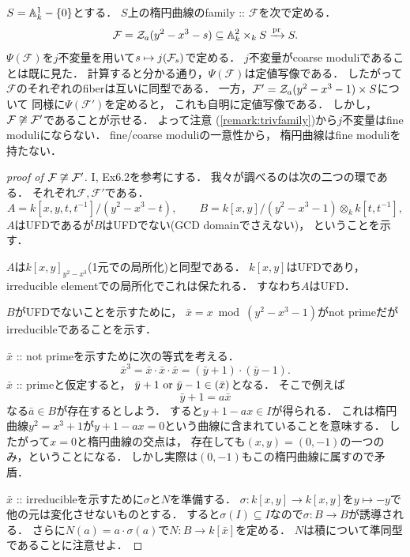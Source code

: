 \documentclass[a4paper]{jsarticle}
\newcommand{\famF}{\mathcal{F}}
\begin{document}
    $S=\mathbb{A}^1_k-\{0\}$とする．
    $S$上の楕円曲線のfamily :: $\famF$を次で定める．
    \[
        \famF=\zerosa(y^2-x^3-s) \subseteq \affine^2_k \times_k S
        \xrightarrow{\pr} S.
    \]
    $\Psi(\famF)$を$j$不変量を用いて$s \mapsto j(\mathcal{F}_s)$で定める．
    $j$不変量がcoarse moduliであることは既に見た．
    計算すると分かる通り，$\Psi(\famF)$は定値写像である．
    したがって$\famF$のそれぞれのfiberは互いに同型である．
    一方，$\famF'=\zerosa(y^2-x^3-1) \times S$について
    同様に$\Psi(\famF')$を定めると，
    これも自明に定値写像である．
    しかし，$\famF \not \iso \famF'$であることが示せる．
    よって注意 (\ref{remark:trivfamily})から$j$不変量はfine moduliにならない．
    fine/coarse moduliの一意性から，
    楕円曲線はfine moduliを持たない．
    \begin{proof}[proof of $\famF \not \iso \famF'$]
        \cite{HarAG} I, Ex6.2を参考にする．
        我々が調べるのは次の二つの環である．
        それぞれ$\famF, \famF'$である．
        \[
            A=k[x,y, t,t^{-1}]/(y^2-x^3-t),
            \qquad
            B=k[x,y]/(y^2-x^3-1) \otimes_k k[t,t^{-1}],
        \]
        $A$はUFDであるが$B$はUFDでない(GCD domainでさえない)，
        ということを示す．

        $A$は$k[x,y]_{y^2-x^3}$(1元での局所化)と同型である．
        $k[x,y]$はUFDであり，irreducible elementでの局所化でこれは保たれる．
        すなわち$A$はUFD．

        $B$がUFDでないことを示すために，
        $\bar{x}=x \bmod (y^2-x^3-1)$がnot primeだがirreducibleであることを示す．

        $\bar{x}$ :: not primeを示すために次の等式を考える．
        \[ \bar{x}^3=\bar{x} \cdot \bar{x} \cdot \bar{x}=(\bar{y}+1) \cdot (\bar{y}-1). \]
        $\bar{x}$ :: primeと仮定すると，
        $\bar{y}+1 \text{ or } \bar{y}-1 \in (\bar{x})$となる．
        そこで例えば
        \[ \bar{y}+1=a \bar{x} \]
        なる$\bar{a} \in B$が存在するとしよう．
        すると$y+1-a x \in I$が得られる．
        これは楕円曲線$y^2=x^3+1$が$y+1-a x=0$という曲線に含まれていることを意味する．
        したがって$x=0$と楕円曲線の交点は，
        存在しても$(x,y)=(0,-1)$の一つのみ，ということになる．
        しかし実際は$(0,-1)$もこの楕円曲線に属すので矛盾．

        $\bar{x}$ :: irreducibleを示すために$\sigma$と$N$を準備する．
        $\sigma: k[x,y] \to k[x,y]$を$y \mapsto -y$で他の元は変化させないものとする．
        すると$\sigma(I) \subseteq I$なので$\sigma: B \to B$が誘導される．
        さらに$N(a)=a \cdot \sigma(a)$で$N: B \to k[\bar{x}]$を定める．
        $N$は積について準同型であることに注意せよ．


\end{proof}
\end{document}
